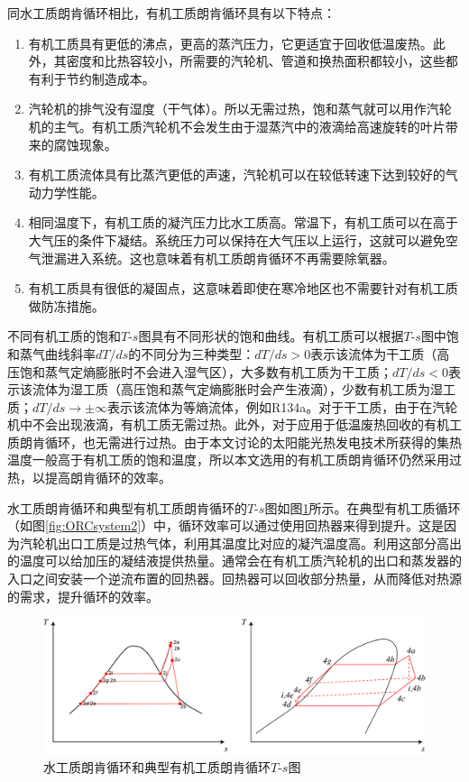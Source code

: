   同水工质朗肯循环相比，有机工质朗肯循环具有以下特点：
  \begin{enumerate}[label=(\arabic*)]
  \item 有机工质具有更低的沸点，更高的蒸汽压力，它更适宜于回收低温废热。此外，其密度和比热容较小，所需要的汽轮机、管道和换热面积都较小，这些都有利于节约制造成本。
  \item 汽轮机的排气没有湿度（干气体）。所以无需过热，饱和蒸气就可以用作汽轮机的主气。有机工质汽轮机不会发生由于湿蒸汽中的液滴给高速旋转的叶片带来的腐蚀现象。
  \item 有机工质流体具有比蒸汽更低的声速，汽轮机可以在较低转速下达到较好的气动力学性能。
  \item 相同温度下，有机工质的凝汽压力比水工质高。常温下，有机工质可以在高于大气压的条件下凝结。系统压力可以保持在大气压以上运行，这就可以避免空气泄漏进入系统。这也意味着有机工质朗肯循环不再需要除氧器。
  \item 有机工质具有很低的凝固点，这意味着即使在寒冷地区也不需要针对有机工质做防冻措施。
  \end{enumerate}

不同有机工质的饱和$T$-$s$图具有不同形状的饱和曲线。有机工质可以根据$T$-$s$图中饱和蒸气曲线斜率$dT/ds$的不同分为三种类型：$dT / ds > 0$表示该流体为干工质（高压饱和蒸气定熵膨胀时不会进入湿气区），大多数有机工质为干工质；$dT / ds < 0$表示该流体为湿工质（高压饱和蒸气定熵膨胀时会产生液滴），少数有机工质为湿工质；$dT/ds \rightarrow \pm\infty$表示该流体为等熵流体，例如R134a。对于干工质，由于在汽轮机中不会出现液滴，有机工质无需过热。此外，对于应用于低温废热回收的有机工质朗肯循环，也无需进行过热。由于本文讨论的太阳能光热发电技术所获得的集热温度一般高于有机工质的饱和温度，所以本文选用的有机工质朗肯循环仍然采用过热，以提高朗肯循环的效率。

水工质朗肯循环和典型有机工质朗肯循环的$T$-$s$图如图\ref{fig:$T$-$s$_2systems}所示。在典型有机工质循环（如图\ref{fig:ORCsystem2}）中，循环效率可以通过使用回热器来得到提升。这是因为汽轮机出口工质是过热气体，利用其温度比对应的凝汽温度高。利用这部分高出的温度可以给加压的凝结液提供热量。通常会在有机工质汽轮机的出口和蒸发器的入口之间安装一个逆流布置的回热器。回热器可以回收部分热量，从而降低对热源的需求，提升循环的效率。

\noindent \begin{figure}[htbp]
\begin{center}
	\includegraphics[width = 0.8\columnwidth]{fig/Ts.pdf}
	\caption{水工质朗肯循环和典型有机工质朗肯循环$T$-$s$图}
	\label{fig:$T$-$s$_2systems}
\end{center}
\end{figure}

